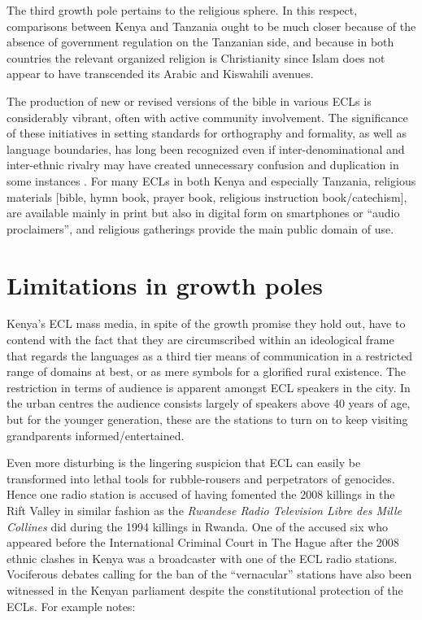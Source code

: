 \documentclass[output=paper,colorlinks,citecolor=brown]{langscibook}
\begin{document}
The third growth pole pertains to the religious sphere. In this respect, comparisons between Kenya and Tanzania ought to be much closer because of the absence of government regulation on the Tanzanian side, and because in both countries the relevant organized religion is Christianity since Islam does not appear to have transcended its Arabic and Kiswahili avenues. 
 
The production of new or revised versions of the bible in various ECLs is considerably vibrant, often with active community involvement. The significance of these initiatives in setting standards for orthography and formality, as well as language boundaries, has long been recognized even if inter-denominational and inter-ethnic rivalry may have created unnecessary confusion and duplication in some instances \citep[242]{Kioko2017}. For many ECLs in both Kenya and especially Tanzania, religious materials [bible, hymn book, prayer book, religious instruction book/catechism], are available mainly in print but also in digital form on smartphones or “audio proclaimers”, and religious gatherings provide the main public domain of use. 

\section{Limitations in growth poles}\label{sec:kioko:4}

Kenya’s ECL mass media, in spite of the growth promise they hold out, have to contend with the fact that they are circumscribed within an ideological frame that regards the languages as a third tier means of communication in a restricted range of domains at best, or as mere symbols for a glorified rural existence.  The restriction in terms of audience is apparent amongst ECL speakers in the city.  In the urban centres the audience consists largely of speakers above 40 years of age, but for the younger generation, these are the stations to turn on to keep visiting grandparents informed/entertained.  

Even more disturbing is the lingering suspicion that ECL can easily be transformed into lethal tools for rubble-rousers and perpetrators of genocides. Hence one radio station is accused of having fomented the 2008 killings in the Rift Valley in similar fashion as the \textit{Rwandese Radio Television Libre des Mille Collines} did during the 1994 killings in Rwanda. One of the accused six who appeared before the International Criminal Court in The Hague after the 2008 ethnic clashes in Kenya was a broadcaster with one of the ECL radio stations. Vociferous debates calling for the ban of the “vernacular” stations have also been witnessed in the Kenyan parliament despite the constitutional protection of the ECLs. For example \citet[123]{Kioko2013} notes: 
\end{document}
